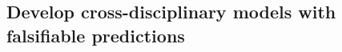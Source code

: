 \documentclass[11pt]{article}
\begin{document}
\subsection*{Develop cross-disciplinary models with falsifiable predictions} 
\end{document}
